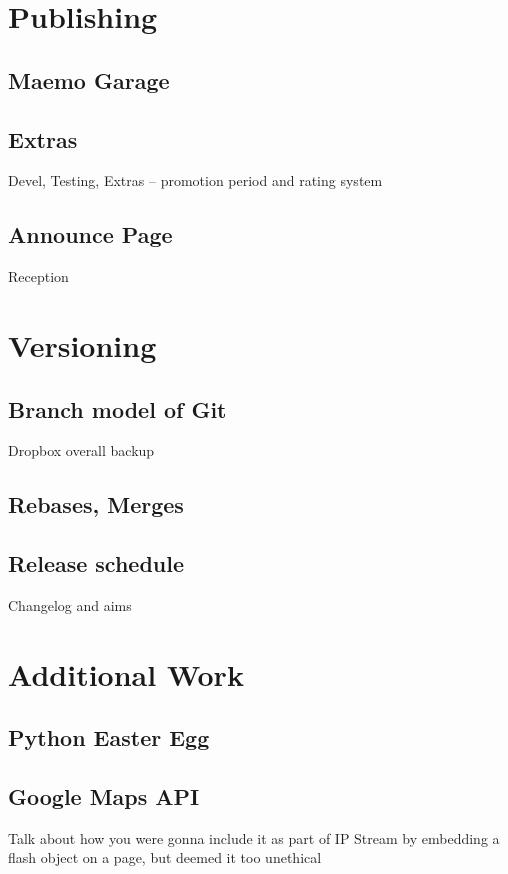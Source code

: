 \documentclass[11pt]{article} %
\begin{document}
\section{Publishing}
\subsection{Maemo Garage}
\subsection{Extras}{Devel, Testing, Extras -- promotion period and rating system}
\subsection{Announce Page}{Reception}

\section{Versioning}
\subsection{Branch model of Git}{Dropbox overall backup}
\subsection{Rebases, Merges}
\subsection{Release schedule}{Changelog and aims}

\section{Additional Work}
\subsection{Python Easter Egg}
\subsection{Google Maps API}{Talk about how you were gonna include it as part of IP Stream by embedding a flash object on a page, but deemed it too unethical}
\end{document}
